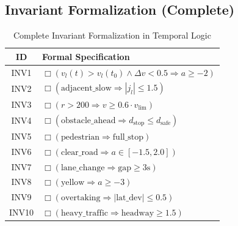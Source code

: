 \documentclass[conference]{IEEEtran}
\theoremstyle{plain}
\begin{document}
\subsection{Invariant Formalization (Complete)}
\begin{table}[h]
\centering
\caption{Complete Invariant Formalization in Temporal Logic}
\label{tab:inv_formal}
\small
\begin{tabular}{cl}
\toprule
\textbf{ID} & \textbf{Formal Specification}\\\midrule
INV1 & $\Box(v_l(t) > v_l(t_0) \land \Delta v < 0.5 \Rightarrow a \geq -2)$\\
INV2 & $\Box(\text{adjacent\_slow} \Rightarrow |j_l| \leq 1.5)$\\
INV3 & $\Box(r > 200 \Rightarrow v \geq 0.6\cdot v_{\text{lim}})$\\
INV4 & $\Box(\text{obstacle\_ahead} \Rightarrow d_{\text{stop}} \leq d_{\text{safe}})$\\
INV5 & $\Box(\text{pedestrian} \Rightarrow \text{full\_stop})$\\
INV6 & $\Box(\text{clear\_road} \Rightarrow a \in [-1.5,2.0])$\\
INV7 & $\Box(\text{lane\_change} \Rightarrow \text{gap} \geq 3\text{s})$\\
INV8 & $\Box(\text{yellow} \Rightarrow a \geq -3)$\\
INV9 & $\Box(\text{overtaking} \Rightarrow |\text{lat\_dev}| \leq 0.5)$\\
INV10 & $\Box(\text{heavy\_traffic} \Rightarrow \text{headway} \geq 1.5)$\\
\bottomrule
\end{tabular}
\end{table}
\end{document}
